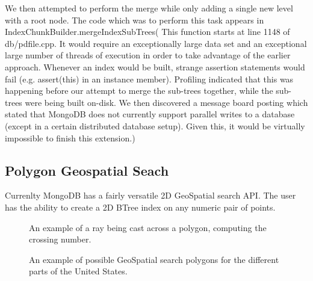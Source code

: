 \documentclass{../dependencies/acm_proc_article-sp}
\begin{document}
We then attempted to perform the merge while only adding a single new level with a root node.
The code which was to perform this task appears in IndexChunkBuilder.mergeIndexSubTrees( This function starts at line 1148 of db/pdfile.cpp.
It would require an exceptionally large data set and an exceptional large number of threads of execution in order to take advantage of the earlier approach.
Whenever an index would be built, strange assertion statements would fail (e.g. assert(this) in an instance member).
Profiling indicated that this was happening before our attempt to merge the sub-trees together, while the sub-trees were being built on-disk.
We then discovered a message board posting which stated that MongoDB does not currently support parallel writes to a database\cite{2} (except in a certain distributed database setup)\cite{3}.
Given this, it would be virtually impossible to finish this extension.)

\subsection{Polygon Geospatial Seach}
Currenlty MongoDB has a fairly versatile 2D GeoSpatial search API.
The user has the ability to create a 2D BTree index on any numeric pair of points.

\begin{figure}[htb]
\centering
\setlength\fboxsep{0.5pt}
\setlength\fboxrule{0.5pt}
\caption{An example of a ray being cast across a polygon, computing the crossing number.}
\end{figure}
 

\begin{figure}[htb]
\centering
\setlength\fboxsep{0.5pt}
\setlength\fboxrule{0.5pt}
\caption{An example of possible GeoSpatial search polygons for the different parts of the United States.}
\end{figure}
 
\end{document}
